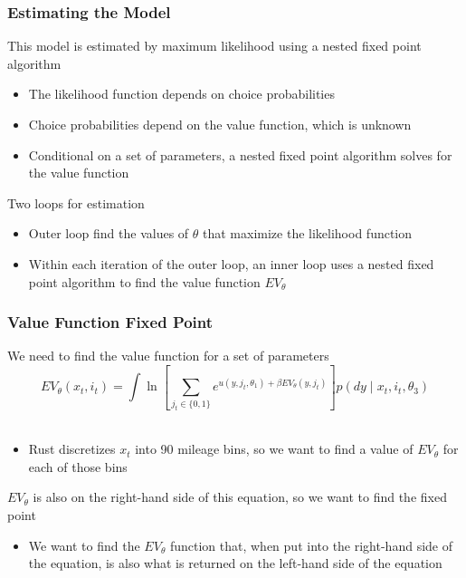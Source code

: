 \documentclass{beamer}
\begin{document}
\begin{frame}\frametitle{Estimating the Model}
    This model is estimated by maximum likelihood using a nested fixed point algorithm
    \begin{itemize}
    	\item The likelihood function depends on choice probabilities
    	\item Choice probabilities depend on the value function, which is unknown
    	\item Conditional on a set of parameters, a nested fixed point algorithm solves for the value function
    \end{itemize}
    \vspace{2ex}
    Two loops for estimation
    \begin{itemize}
    	\item Outer loop find the values of $\theta$ that maximize the likelihood function
    	\item Within each iteration of the outer loop, an inner loop uses a nested fixed point algorithm to find the value function $EV_{\theta}$
    \end{itemize}
\end{frame}

\begin{frame}\frametitle{Value Function Fixed Point}
    We need to find the value function for a set of parameters
    $$EV_{\theta}(x_t, i_t) = \int \ln \left[ \sum_{j_t \in \{0, 1\}} e^{u(y, j_t, \theta_1) + \beta EV_{\theta}(y, j_t)} \right] p(dy \mid x_t, i_t, \theta_3)$$ \\
    \begin{itemize}
    	\item Rust discretizes $x_t$ into 90 mileage bins, so we want to find a value of $EV_{\theta}$ for each of those bins
    \end{itemize}
    \vspace{2ex}
    $EV_{\theta}$ is also on the right-hand side of this equation, so we want to find the fixed point
    \begin{itemize}
    	\item We want to find the $EV_{\theta}$ function that, when put into the right-hand side of the equation, is also what is returned on the left-hand side of the equation
    \end{itemize}
\end{frame}
\end{document}
